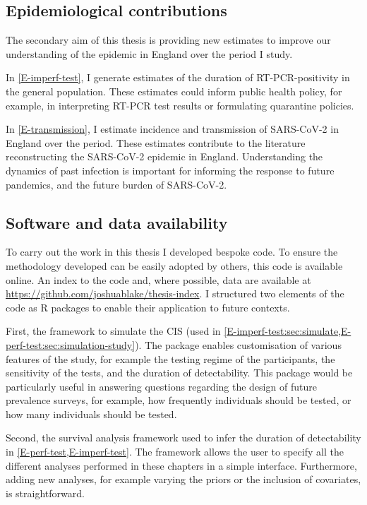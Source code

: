 \documentclass[thesis.tex]{subfiles}
\begin{document}
\subsection{Epidemiological contributions}

The secondary aim of this thesis is providing new estimates to improve our understanding of the epidemic in England over the period I study.

In \cref{E-imperf-test}, I generate estimates of the duration of RT-PCR-positivity in the general population.
These estimates could inform public health policy, for example, in interpreting RT-PCR test results or formulating quarantine policies.

In \cref{E-transmission}, I estimate incidence and transmission of SARS-CoV-2 in England over the period.
These estimates contribute to the literature reconstructing the SARS-CoV-2 epidemic in England.
Understanding the dynamics of past infection is important for informing the response to future pandemics, and the future burden of SARS-CoV-2.

\subsection{Software and data availability}

To carry out the work in this thesis I developed bespoke code.
To ensure the methodology developed can be easily adopted by others, this code is available online.
An index to the code and, where possible, data are available at \url{https://github.com/joshuablake/thesis-index}.
I structured two elements of the code as R packages to enable their application to future contexts.

First, the framework to simulate the CIS (used in \cref{E-imperf-test:sec:simulate,E-perf-test:sec:simulation-study}).
The package enables customisation of various features of the study, for example the testing regime of the participants, the sensitivity of the tests, and the duration of detectability.
This package would be particularly useful in answering questions regarding the design of future prevalence surveys, for example, how frequently individuals should be tested, or how many individuals should be tested.

Second, the survival analysis framework used to infer the duration of detectability in \cref{E-perf-test,E-imperf-test}.
The framework allows the user to specify all the different analyses performed in these chapters in a simple interface. 
Furthermore, adding new analyses, for example varying the priors or the inclusion of covariates, is straightforward.
\end{document}
